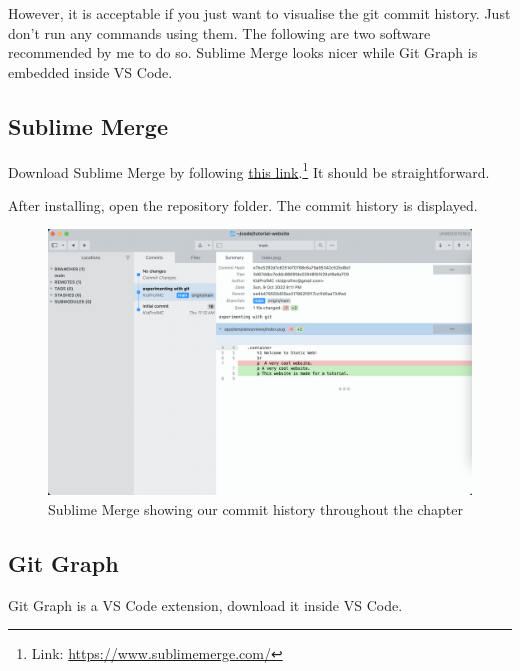 However, it is acceptable if you just want to visualise the git commit history. Just don't run any commands using them. The following are two software recommended by me to do so. Sublime Merge looks nicer while Git Graph is embedded inside VS Code. 

\subsection*{Sublime Merge}

Download Sublime Merge by following \href{https://www.sublimemerge.com/}{this link}.\footnote{Link: \url{https://www.sublimemerge.com/}} It should be straightforward. 

After installing, open the repository folder. The commit history is displayed.

\begin{figure}[h]
\centering
\includegraphics[width=15cm]{images/ch3-sublimemerge.png}
\caption{Sublime Merge showing our commit history throughout the chapter}
\end{figure}

\subsection*{Git Graph}

Git Graph is a VS Code extension, download it inside VS Code.

